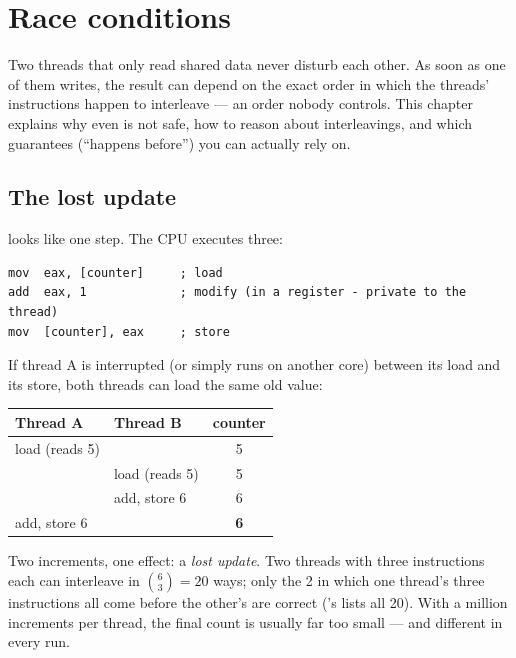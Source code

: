 \chapter{Race conditions}
\label{ch:races}

Two threads that only read shared data never disturb each other. As soon
as one of them writes, the result can depend on the exact order in which
the threads' instructions happen to interleave --- an order nobody
controls. This chapter explains why even  is not safe,
how to reason about interleavings, and which guarantees (``happens
before'') you can actually rely on.

\section{The lost update}

 looks like one step. The CPU executes three:

\begin{lstlisting}
mov  eax, [counter]     ; load
add  eax, 1             ; modify (in a register - private to the thread)
mov  [counter], eax     ; store
\end{lstlisting}

If thread A is interrupted (or simply runs on another core) between its
load and its store, both threads can load the same old value:

\begin{center}
\begin{tabular}{llc}
\toprule
\textbf{Thread A} & \textbf{Thread B} & \textbf{counter} \\
\midrule
load (reads 5)    &                    & 5 \\
                  & load (reads 5)     & 5 \\
                  & add, store 6       & 6 \\
add, store 6      &                    & \textbf{6} \\
\bottomrule
\end{tabular}
\end{center}

Two increments, one effect: a \emph{lost update}. Two threads with three
instructions each can interleave in $\binom{6}{3} = 20$ ways; only the 2
in which one thread's three instructions all come before the other's are
correct ('s  lists all 20). With a million
increments per thread, the final count is usually far too small --- and
different in every run.

